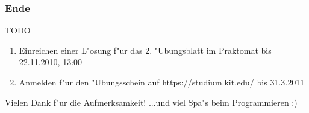 \documentclass{beamer}
\begin{document}
\begin{frame}
\frametitle{Ende}
\begin{block}{TODO}
\begin{enumerate}
\item Einreichen einer L"osung f"ur das 2. "Ubungsblatt im Praktomat bis \alert{22.11.2010, 13:00}
\item Anmelden f"ur den "Ubungsschein auf https://studium.kit.edu/ bis \alert{31.3.2011}
\end{enumerate}
\end{block}

\begin{block}{Vielen Dank f"ur die Aufmerksamkeit!}
...und viel Spa"s beim Programmieren :)
\end{block}
\end{frame}
\end{document}

